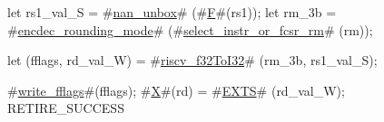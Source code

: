 let rs1_val_S = #\hyperref[sailRISCVznanzyunbox]{nan\_unbox}# (#\hyperref[sailRISCVzF]{F}#(rs1));
let rm_3b     = #\hyperref[sailRISCVzencdeczyroundingzymode]{encdec\_rounding\_mode}# (#\hyperref[sailRISCVzselectzyinstrzyorzyfcsrzyrm]{select\_instr\_or\_fcsr\_rm}#  (rm));

let (fflags, rd_val_W) = #\hyperref[sailRISCVzriscvzyf32ToI32]{riscv\_f32ToI32}# (rm_3b, rs1_val_S);

#\hyperref[sailRISCVzwritezyfflags]{write\_fflags}#(fflags);
#\hyperref[sailRISCVzX]{X}#(rd) = #\hyperref[sailRISCVzEXTS]{EXTS}# (rd_val_W);
RETIRE_SUCCESS
